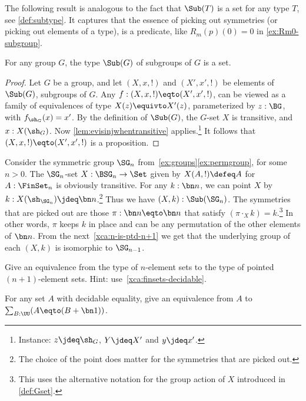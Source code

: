 The following result is analogous to the fact that $\Sub(T)$ is
a set for any type $T$, see \cref{def:subtype}. It captures
that the essence of picking out symmetries (or picking out elements
of a type), is a predicate, like $R_m(p)(0)=0$ in \cref{ex:Rm0-subgroup}.

\begin{lemma}
  \label{lem:SubGisset}%
  For any group $G$, the type $\Sub(G)$ of subgroups of $G$ is a set.
\end{lemma}
\begin{proof}
Let $G$ be a group, and let $(X,x,!)$ and $(X',x',!)$ be 
elements of $\Sub(G)$, \ie subgroups of $G$. Any $f: (X,x,!)\eqto(X',x',!)$,
can be viewed as a family of equivalences of type $X(z) \equivto X'(z)$,
parameterized by $z:\BG$, with $f_{\sh_G}(x)=x'$.
By the definition of $\Sub(G)$, the $G$-set $X$ is transitive,
and $x:X(\sh_G)$.
Now \cref{lem:evisinjwhentransitive} applies.\footnote{%
Instance: $z\jdeq\sh_G$, $Y\jdeq X'$ and $y\jdeq x'$.}
It follows that $(X,x,!)\eqto(X',x',!)$
is a proposition.
\end{proof}

\begin{example}
  \label{exa:fix1subSGn}%
Consider the symmetric group $\SG_n$ from~\cref{ex:groups}\ref{ex:permgroup},
for some $n>0$. The $\SG_n$-set $X : \BSG_n \to\Set$ given by $X(A,!)\defeq A$
for $A:\FinSet_n$ is obviously transitive.
For any $k:\bn n$, we can point $X$ by
$k: X(\sh_{\SG_n}) \jdeq \bn n$.\footnote{The choice of the point
does matter for the symmetries that are picked out.}
Thus we have $(X,k):\Sub(\SG_n)$.
The symmetries that are picked out are those $\pi : \bn n \eqto \bn n$
that satisfy $(\pi \cdot_X k) = k$.\footnote{%
This uses the alternative notation for the group action of $X$
introduced in \cref{def:Gset}.}
In other words, $\pi$ keeps $k$ in place and can be any permutation
of the other elements of $\bn n$.
From the next~\cref{xca:n-is-ptd-n+1}
we get that the underlying group of each $(X,k)$
is isomorphic to $\SG_{n-1}$.
\end{example}

\begin{xca}\label{xca:n-is-ptd-n+1}
  Give an equivalence from the type of
  $n$-element sets to the type of pointed $(n{+}1)$-element sets.
  Hint: use~\cref{xca:finsets-decidable}.
\end{xca}

\begin{xca} \label{xca:A-is-A-1+1}
  For any set $A$ with decidable equality,
  give an equivalence from $A$ to $\sum_{B:\UU}(A\eqto(B+\bn1))$.
\end{xca}

